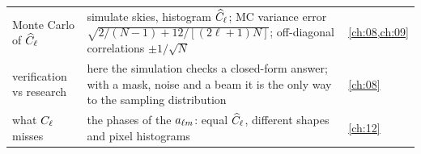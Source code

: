 \begin{center}
\begin{tabularx}{\linewidth}{@{}>{\raggedright\arraybackslash}p{3.3cm}
                               >{\raggedright\arraybackslash}X
                               >{\raggedright\arraybackslash}p{2.5cm}@{}}
Monte Carlo of $\widehat{C}_\ell$ & simulate skies, histogram $\widehat{C}_\ell$; MC variance error $\sqrt{2/(N-1)+12/[(2\ell+1)N]}$; off-diagonal correlations $\pm1/\sqrt N$ & \cref{ch:08,ch:09}\\
verification vs research & here the simulation checks a closed-form answer; with a mask, noise and a beam it is the only way to the sampling distribution & \cref{ch:08}\\
what $C_\ell$ misses & the phases of the $a_{\ell m}$: equal $\widehat{C}_\ell$, different shapes and pixel histograms & \cref{ch:12}\\
\bottomrule
\end{tabularx}
\end{center}
  